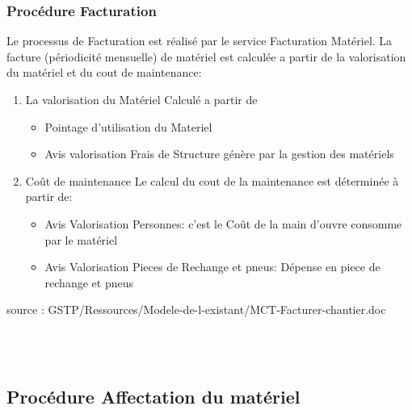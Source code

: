\documentclass [a4paper] {report}
\begin{document}
\subsubsection{Procédure Facturation}
	Le processus de Facturation est réalisé par le service Facturation Matériel. La facture (périodicité mensuelle) de matériel est calculée a partir de 
	la valorisation du matériel et du cout de maintenance:\\
\begin {enumerate}
	\item La valorisation du Matériel
		Calculé a partir de \\
		\begin{itemize}
			\item Pointage d'utilisation du Materiel\\
			\item Avis valorisation Frais de Structure génère par la gestion des matériels	\\
		\end{itemize}	
	\item Coût de maintenance
		Le calcul du cout de la maintenance est déterminée à partir de:\\
		\begin{itemize}
			\item Avis Valorisation Personnes: c'est le Coût de la main d'ouvre  consomme par le matériel\\
			\item Avis Valorisation Pieces de Rechange et pneus: Dépense en piece de rechange et pneus \\
		\end{itemize}

\end{enumerate}

source : GSTP/Ressources/Modele-de-l-existant/MCT-Facturer-chantier.doc

\hfill\\
\hfill\\
\subsection{Procédure Affectation du matériel}
\end{document}

